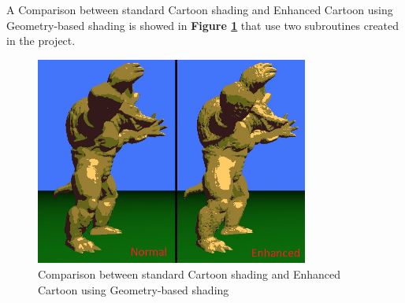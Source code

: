 A Comparison between standard Cartoon shading and Enhanced Cartoon using Geometry-based shading is showed in \textbf{Figure \ref{fig:cartoon_comparison}} that use two subroutines created in the project.
\begin{figure}[h]
	\centering
	\includegraphics[width=0.8\textwidth]{Images/cartoon_comparison.png}
	\caption{Comparison between standard Cartoon shading and Enhanced Cartoon using Geometry-based shading}
	\label{fig:cartoon_comparison}
\end{figure}

